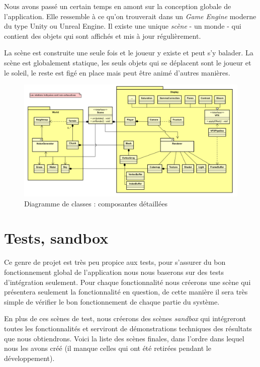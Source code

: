 \documentclass{EPUProjetDi}
\begin{document}
Nous avons passé un certain temps en amont sur la conception globale de l'application. Elle ressemble à ce qu'on trouverait dans un \textit{Game Engine} moderne du type Unity ou Unreal Engine. Il existe une unique \textit{scène} - un monde - qui contient des objets qui sont affichés et mis à jour régulièrement.

La scène est construite une seule fois et le joueur y existe et peut s'y balader. La scène est globalement statique, les seuls objets qui se déplacent sont le joueur et le soleil, le reste est figé en place mais peut être animé d'autres manières.

\begin{figure}[ht]
	\centering
	\includegraphics[scale=.49]{detailed_structure_uml}
	\caption{Diagramme de classes : composantes détaillées}
\end{figure}

\section{Tests, sandbox}

Ce genre de projet est très peu propice aux tests, pour s'assurer du bon fonctionnement global de l'application nous nous baserons sur des tests d'intégration seulement. Pour chaque fonctionnalité nous créerons une scène qui présentera seulement la fonctionnalité en question, de cette manière il sera très simple de vérifier le bon fonctionnement de chaque partie du système.

En plus de ces scènes de test, nous créerons des scènes \textit{sandbox} qui intégreront toutes les fonctionnalités et serviront de démonstrations techniques des résultats que nous obtiendrons. Voici la liste des scènes finales, dans l'ordre dans lequel nous les avons créé (il manque celles qui ont été retirées pendant le développement).
\end{document}
